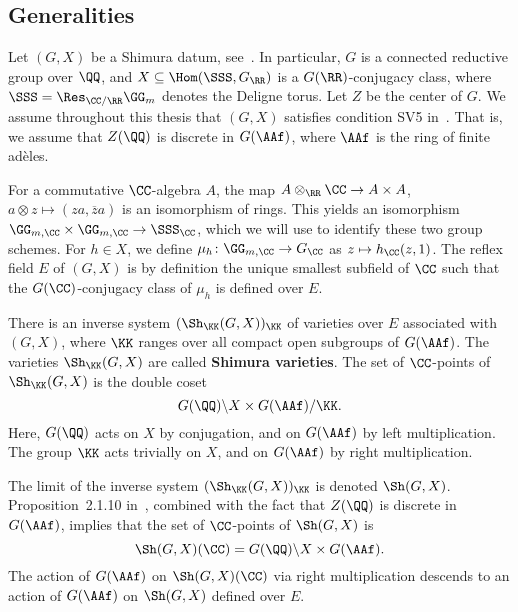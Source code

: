 \subsection{Generalities}
Let $(G,X)$ be a Shimura datum, see~\cite[Definition~5.5]{MilneShimura}. In particular, $G$ is a connected reductive group over $\QQ$, and $X \subseteq \Hom(\SSS,G_{\RR})$ is a $G(\RR)$-conjugacy class, where $\SSS = \Res_{\CC/\RR} \GG_m$ denotes the Deligne torus. Let $Z$ be the center of $G$. We assume throughout this thesis that $(G,X)$ satisfies condition SV5 in~\cite{MilneShimura}. That is, we assume that $Z(\QQ)$ is discrete in $G(\AAf)$, where $\AAf$ is the ring of finite ad\`eles.


For a commutative $\CC$-algebra $A$, the map $A \otimes_{\RR} \CC \rightarrow A \times A$, $a \otimes z \mapsto (za,\overline{z}a)$ is an isomorphism of rings. This yields an isomorphism $\GG_{m,\CC} \times \GG_{m,\CC} \rightarrow \SSS_{\CC}$, which we will use to identify these two group schemes. For $h \in X$, we define $\mu_h\colon \GG_{m,\CC} \rightarrow G_{\CC}$ as $z \mapsto h_{\CC}(z,1)$. The reflex field $E$ of $(G,X)$ is by definition the unique smallest subfield of $\CC$ such that the $G(\CC)$-conjugacy class of $\mu_h$ is defined over $E$.

There is an inverse system $(\Sh_{\KK}(G,X))_{\KK}$ of varieties over $E$ associated with $(G,X)$, where $\KK$ ranges over all compact open subgroups of $G(\AAf)$. The varieties $\Sh_{\KK}(G,X)$ are called {\bfseries Shimura varieties}. The set of $\CC$-points of $\Sh_{\KK}(G,X)$ is the double coset
$$
G(\QQ) \backslash X \times G(\AAf) / \KK.
$$
Here, $G(\QQ)$ acts on $X$ by conjugation, and on $G(\AAf)$ by left multiplication. The group $\KK$ acts trivially on $X$, and on $G(\AAf)$ by right multiplication.

The limit of the inverse system $(\Sh_{\KK}(G,X))_{\KK}$ is denoted $\Sh(G,X)$. Proposition~2.1.10 in~\cite{Deligne79}, combined with the fact that $Z(\QQ)$ is discrete in $G(\AAf)$, implies that the set of $\CC$-points of $\Sh(G,X)$ is
$$
\Sh(G,X)(\CC) = G(\QQ) \backslash X \times G(\AAf).
$$
The action of $G(\AAf)$ on $\Sh(G,X)(\CC)$ via right multiplication descends to an action of $G(\AAf)$ on $\Sh(G,X)$ defined over $E$.

